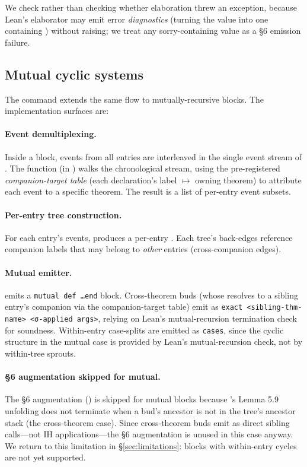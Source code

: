 We check  rather than checking whether elaboration threw
an exception, because Lean's elaborator may emit error \emph{diagnostics}
(turning the value into one containing ) without raising; we
treat any sorry-containing value as a §6 emission failure.

\subsection{Mutual cyclic systems}
\label{sec:impl-mutual}

The  command extends the same flow to mutually-recursive
blocks. The implementation surfaces are:

\paragraph{Event demultiplexing.}
Inside a  block, events from all entries are
interleaved in the single event stream of . The function
 (in ) walks the chronological
stream, using the pre-registered \emph{companion-target table} (each
 declaration's label \(\mapsto\) owning theorem) to
attribute each event to a specific theorem. The result is a list of
per-entry event subsets.

\paragraph{Per-entry tree construction.}
For each entry's events,  produces a
per-entry . Each tree's back-edges reference companion
labels that may belong to \emph{other} entries (cross-companion edges).

\paragraph{Mutual emitter.}
 emits a \texttt{mutual def \dots end}
block. Cross-theorem buds (whose  resolves to a sibling
entry's companion via the companion-target table) emit as
\texttt{exact <sibling-thm-name> <σ-applied args>}, relying on Lean's
mutual-recursion termination check for soundness. Within-entry case-splits
are emitted as \texttt{cases}, since the cyclic structure in the mutual
case is provided by Lean's mutual-recursion check, not by within-tree
sprouts.

\paragraph{§6 augmentation skipped for mutual.}
The §6 augmentation () is skipped for mutual blocks
because 's Lemma 5.9 unfolding does not terminate when
a bud's ancestor is not in the tree's ancestor stack (the cross-theorem
case). Since cross-theorem buds emit as direct sibling calls---not IH
applications---the §6 augmentation is unused in this case anyway. We
return to this limitation in §\ref{sec:limitations}: 
blocks with within-entry cycles are not yet supported.

